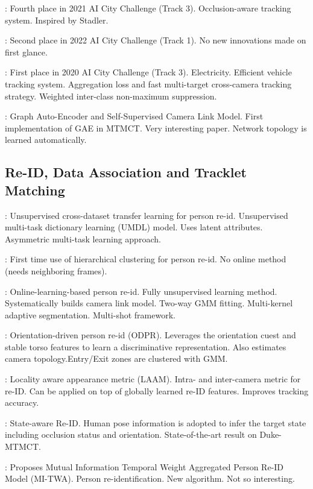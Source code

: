\cite{Specker21}: Fourth place in 2021 AI City Challenge (Track 3). Occlusion-aware tracking system. Inspired by Stadler.

\cite{Li22a}: Second place in 2022 AI City Challenge (Track 1). No new innovations made on first glance.

\cite{Qian20}: First place in 2020 AI City Challenge (Track 3). Electricity. Efficient vehicle tracking system. Aggregation loss and fast multi-target cross-camera tracking strategy. Weighted inter-class non-maximum suppression.

\cite{Hsu22}: Graph Auto-Encoder and Self-Supervised Camera Link Model. First implementation of GAE in MTMCT. Very interesting paper. Network topology is learned automatically.

\subsection{Re-ID, Data Association and Tracklet Matching}

\cite{Peng16}: Unsupervised cross-dataset transfer learning for person re-id. Unsupervised multi-task dictionary learning (UMDL) model. Uses latent attributes. Asymmetric multi-task learning approach.

\cite{Zhang17}: First time use of hierarchical clustering for person re-id. No online method (needs neighboring frames).

\cite{Lee18}: Online-learning-based person re-id. Fully unsupervised learning method. Systematically  builds camera link model. Two-way GMM fitting. Multi-kernel adaptive segmentation. Multi-shot framework.

\cite{Jiang18}: Orientation-driven person re-id (ODPR). Leverages the orientation cuest and stable torso features to learn a discriminative representation. Also estimates camera topology.Entry/Exit zones are clustered with GMM.

\cite{Hou19}: Locality aware appearance metric (LAAM). Intra- and inter-camera metric for re-ID. Can be applied on top of globally learned re-ID features. Improves tracking accuracy.

\cite{Li19}: State-aware Re-ID. Human pose information is adopted to infer the target state including occlusion status and orientation. State-of-the-art result on Duke-MTMCT.

\cite{Li22b}: Proposes Mutual Information Temporal Weight Aggregated Person Re-ID Model (MI-TWA). Person re-identification. New algorithm. Not so interesting.

